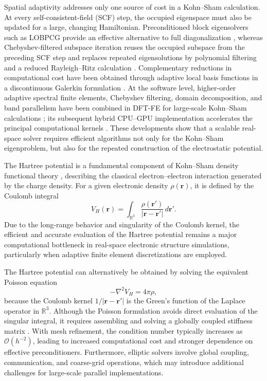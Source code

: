 \documentclass[a4paper,10pt]{article}
\begin{document}
Spatial adaptivity addresses only one source of cost in a Kohn--Sham calculation. At every self-consistent-field (SCF) step, the occupied eigenspace must also be updated for a large, changing Hamiltonian. Preconditioned block eigensolvers such as LOBPCG provide an effective alternative to full diagonalization \cite{Knyazev2001}, whereas Chebyshev-filtered subspace iteration reuses the occupied subspace from the preceding SCF step and replaces repeated eigensolutions by polynomial filtering and a reduced Rayleigh--Ritz calculation \cite{ZhouSaad2006}. Complementary reductions in computational cost have been obtained through adaptive local basis functions in a discontinuous Galerkin formulation \cite{LinLuYingE2012}. At the software level, higher-order adaptive spectral finite elements, Chebyshev filtering, domain decomposition, and band parallelism have been combined in DFT-FE for large-scale Kohn--Sham calculations \cite{Motamarri2020}; its subsequent hybrid CPU--GPU implementation accelerates the principal computational kernels \cite{Das2022}. These developments show that a scalable real-space solver requires efficient algorithms not only for the Kohn--Sham eigenproblem, but also for the repeated construction of the electrostatic potential.

The Hartree potential is a fundamental component of Kohn--Sham density functional theory
\cite{Kohn1965,Parr1989,Martin2004}, describing the classical electron--electron interaction generated by the charge density. For a given electronic density $\rho(\mathbf r)$, it is defined by the Coulomb integral
\[
V_H(\mathbf r)=
\int_{\mathbb{R}^{3}}
\frac{\rho(\mathbf r')}
{|\mathbf r-\mathbf r'|}
\,d\mathbf r'.
\]
Due to the long-range behavior and singularity of the Coulomb kernel, the efficient and accurate evaluation of the Hartree potential remains a major computational bottleneck in real-space electronic structure simulations, particularly when adaptive finite element discretizations are employed.

The Hartree potential can alternatively be obtained by solving the equivalent Poisson equation
\[
-\nabla^2 V_H = 4\pi\rho,
\]
because the Coulomb kernel $1/|\mathbf r-\mathbf r'|$ is the Green's function of the Laplace operator in $\mathbb{R}^3$. Although the Poisson formulation avoids direct evaluation of the singular integral, it requires assembling and solving a globally coupled stiffness matrix
\cite{Hackbusch1985,Saad2003}. With mesh refinement, the condition number typically increases as $\mathcal{O}(h^{-2})$, leading to increased computational cost and stronger dependence on effective preconditioners. Furthermore, elliptic solvers involve global coupling, communication, and coarse-grid operations, which may introduce additional challenges for large-scale parallel implementations.
\end{document}
